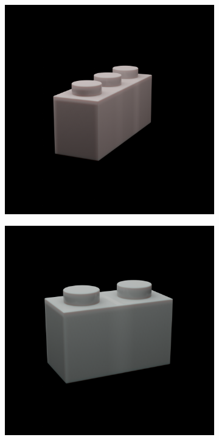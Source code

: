 \documentclass[]{article}
\begin{document}
\begin{figure}[h]
\begin{subfigure}[b]{0.2\textwidth}
    \end{subfigure}
    \begin{subfigure}[b]{0.2\textwidth}
        \includegraphics[width=\textwidth]{generated images/31.png}
    \end{subfigure}
    \begin{subfigure}[b]{0.2\textwidth}
        \includegraphics[width=\textwidth]{generated images/32.png}

\end{subfigure}
\end{figure}
\end{document}
